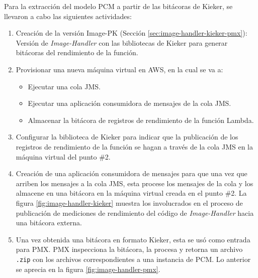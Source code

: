 Para la extracción del modelo PCM a partir de las bitácoras de Kieker, se llevaron a cabo las siguientes actividades:
\begin{enumerate}
    \item Creación de la versión Image-PK (Sección \ref{sec:image-handler-kieker-pmx}): Versión de \emph{Image-Handler} con las bibliotecas de Kieker para generar bitácoras del rendimiento de la función.    
    \item Provisionar una nueva máquina virtual en AWS, en la cual se va a:
    \begin{itemize}
        \item Ejecutar una cola JMS.
        \item Ejecutar una aplicación consumidora de mensajes de la cola JMS.
        \item Almacenar la bitácora de registros de rendimiento de la función Lambda.
    \end{itemize}

    \item Configurar la biblioteca de Kieker para indicar que la publicación de los registros de rendimiento de la función se hagan a través de la cola JMS en la máquina virtual del punto \#2.
    \item Creación de una aplicación consumidora de mensajes para que una vez que arriben los mensajes a la cola JMS, esta procese los mensajes de la cola y los almacene en una bitácora en la máquina virtual creada en el punto \#2. La figura \ref{fig:image-handler-kieker} muestra los involucrados en el proceso de publicación de mediciones de rendimiento del código de \emph{Image-Handler} hacia una bitácora externa.
    \item Una vez obtenida una bitácora en formato Kieker, esta se usó como entrada para PMX. PMX inspecciona la bitácora, la procesa y retorna un archivo \texttt{.zip} con los archivos correspondientes a una instancia de PCM. Lo anterior se aprecia en la figura \ref{fig:image-handler-pmx}.
\end{enumerate}

